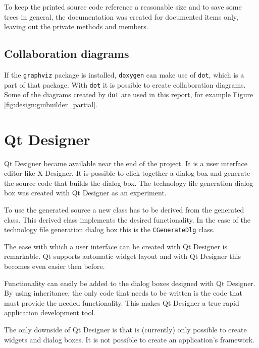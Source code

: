 To keep the printed source code reference a reasonable size and to save some
trees in general, the documentation was created for documented items only,
leaving out the private methods and members.

\subsection{Collaboration diagrams}
If the \verb=graphviz= package is installed, \verb=doxygen= can make use of
\verb=dot=, which is a part of that package. With \verb=dot= it is possible to
create collaboration diagrams. Some of the diagrams created by \verb=dot= are
used in this report, for example Figure \ref{fig:design:guibuilder_partial}.

\section{Qt Designer}
Qt Designer became available near the end of the project. It is a user
interface editor like X-Designer. It is possible to click together a dialog box
and generate the source code that builds the dialog box. The technology file
generation dialog box was created with Qt Designer as an experiment.

To use the generated source a new class has to be derived from the generated
class. This derived class implements the desired functionality. In the case of
the technology file generation dialog box this is the \verb=CGenerateDlg=
class.

\bigskip \noindent
The ease with which a user interface can be created with Qt Designer is
remarkable. Qt supports automatic widget layout and with Qt Designer this
becomes even easier then before.

Functionality can easily be added to the dialog boxes designed with Qt
Designer. By using inheritance, the only code that needs to be written is the
code that must provide the needed functionality. This makes Qt Designer a true
rapid application development tool.

The only downside of Qt Designer is that is (currently) only possible to create
widgets and dialog boxes. It is not possible to create an application's
framework.
